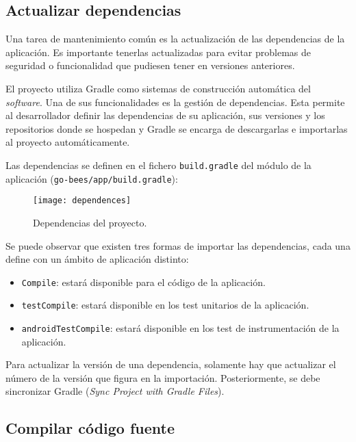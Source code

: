 \subsection{Actualizar dependencias}\label{actualizar-dependencias}

Una tarea de mantenimiento común es la actualización de las dependencias
de la aplicación. Es importante tenerlas actualizadas para evitar
problemas de seguridad o funcionalidad que pudiesen tener en versiones
anteriores.

El proyecto utiliza Gradle como sistemas de construcción automática del
\emph{software}. Una de sus funcionalidades es la gestión de
dependencias. Esta permite al desarrollador definir las dependencias de
su aplicación, sus versiones y los repositorios donde se hospedan y
Gradle se encarga de descargarlas e importarlas al proyecto
automáticamente.

Las dependencias se definen en el fichero \texttt{build.gradle} del
módulo de la aplicación (\texttt{go-bees/app/build.gradle}):

\begin{figure}[H]
	\centering
	\texttt{[image: dependences]}
	\caption{Dependencias del proyecto.}\label{fig:dependences}
\end{figure}

Se puede observar que existen tres formas de importar las dependencias,
cada una define con un ámbito de aplicación distinto:

\begin{itemize}
\tightlist
\item
  \texttt{Compile}: estará disponible para el código de la aplicación.
\item
  \texttt{testCompile}: estará disponible en los test unitarios de la
  aplicación.
\item
  \texttt{androidTestCompile}: estará disponible en los test de
  instrumentación de la aplicación.
\end{itemize}

Para actualizar la versión de una dependencia, solamente hay que
actualizar el número de la versión que figura en la importación.
Posteriormente, se debe sincronizar Gradle (\emph{Sync Project with
Gradle Files}).

\subsection{Compilar código fuente}\label{compilar-codigo-fuente}

